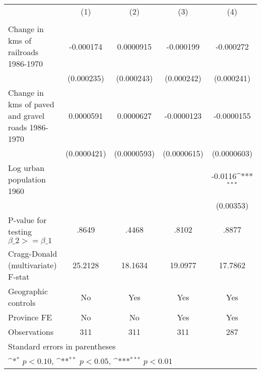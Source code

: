 {
\def\sym#1{\ifmmode^{#1}\else\(^{#1}\)\fi}
\begin{tabular}{l*{4}{c}}
\hline\hline
                &\multicolumn{1}{c}{(1)}&\multicolumn{1}{c}{(2)}&\multicolumn{1}{c}{(3)}&\multicolumn{1}{c}{(4)}\\
                &\multicolumn{1}{c}{}&\multicolumn{1}{c}{}&\multicolumn{1}{c}{}&\multicolumn{1}{c}{}\\
\hline
Change in kms of railroads 1986-1970&-0.000174         &0.0000915         &-0.000199         &-0.000272         \\
                &(0.000235)         &(0.000243)         &(0.000242)         &(0.000241)         \\
[1em]
Change in kms of paved and gravel roads 1986-1970&0.0000591         &0.0000627         &-0.0000123         &-0.0000155         \\
                &(0.0000421)         &(0.0000593)         &(0.0000615)         &(0.0000603)         \\
[1em]
Log urban population 1960&                  &                  &                  &  -0.0116\sym{***}\\
                &                  &                  &                  &(0.00353)         \\
\hline
P-value for testing $\beta\_{2} >= \beta\_{1}$&    .8649         &    .4468         &    .8102         &    .8877         \\
Cragg-Donald (multivariate) F-stat&  25.2128         &  18.1634         &  19.0977         &  17.7862         \\
Geographic controls&       No         &      Yes         &      Yes         &      Yes         \\
Province FE     &       No         &       No         &      Yes         &      Yes         \\
Observations    &      311         &      311         &      311         &      287         \\
\hline\hline
\multicolumn{5}{l}{\footnotesize Standard errors in parentheses}\\
\multicolumn{5}{l}{\footnotesize \sym{*} \(p<0.10\), \sym{**} \(p<0.05\), \sym{***} \(p<0.01\)}\\
\end{tabular}
}
